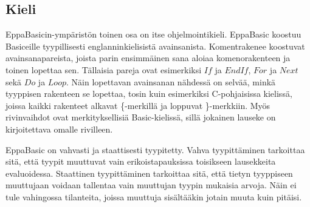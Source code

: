 \subsection{Kieli}
EppaBasicin-ympäristön toinen osa on
itse ohjelmointikieli.
EppaBasic koostuu Basiceille tyypillisesti
englanninkielisistä avainsanista.
Komentrakenee koostuvat avainsanapareista,
joista parin ensimmäinen sana aloiaa komenorakenteen
ja toinen lopettaa sen.
Tällaisia pareja ovat esimerkiksi
$If$ ja $End If$,
$For$ ja $Next$
sekä $Do$ ja $Loop$.
Näin lopettavan avainsanan nähdessä on selvää,
minkä tyyppisen rakenteen se lopettaa,
tosin kuin esimerkiksi C-pohjaisissa
kielissä, joissa kaikki rakenteet alkavat
\{-merkillä ja loppuvat \}-merkkiin.
Myös rivinvaihdot ovat merkityksellisiä
Basic-kielissä, sillä jokainen lauseke
on kirjoitettava omalle rivilleen.


EppaBasic on vahvasti ja staattisesti tyypitetty.
Vahva tyypittäminen tarkoittaa sitä,
että tyypit muuttuvat vain erikoistapauksissa toisikseen
lausekkeita evaluoidessa.
Staattinen tyypittäminen tarkoittaa sitä,
että tietyn tyyppiseen muuttujaan voidaan tallentaa
vain muuttujan tyypin mukaisia arvoja.
Näin ei tule vahingossa tilanteita,
joissa muuttuja sisältääkin jotain muuta kuin pitäisi.
